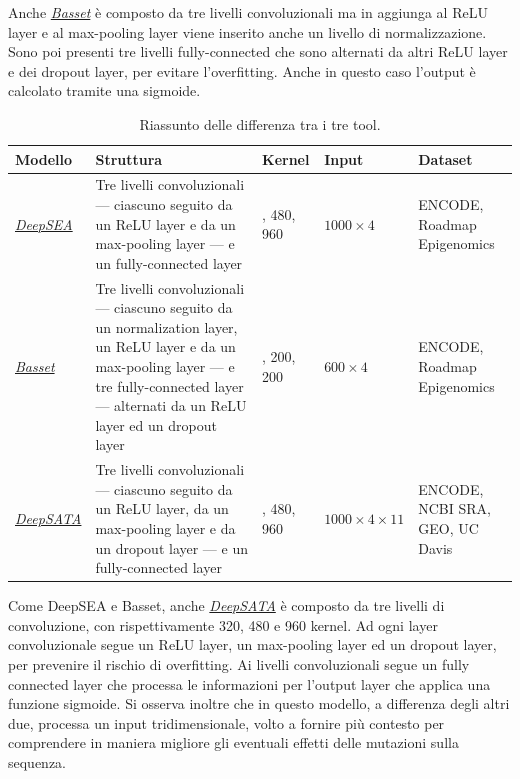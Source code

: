 Anche \hyperref[sec:Basset]{\textsl{Basset}} è composto da tre livelli convoluzionali ma in aggiunga al \acs{ReLU} layer e al max-pooling layer viene inserito anche un livello di normalizzazione. Sono poi presenti tre livelli fully-connected che sono alternati da altri \acs{ReLU} layer e dei dropout layer, per evitare l'overfitting. Anche in questo caso l'output è calcolato tramite una sigmoide.
% 
\begin{table}[!t]
    \centering
    \caption{Riassunto delle differenza tra i tre tool.}\label{tab:summary}
    \renewcommand{\arraystretch}{2}
    \begin{tabular}{|>{\centering\arraybackslash}m{2cm}|>{\centering\arraybackslash}m{4.5cm}|>{\centering\arraybackslash}m{1.5cm}|>{\centering\arraybackslash}m{1.5cm}|>{\centering\arraybackslash}m{3cm}|} %
        \hline %
        \textbf{Modello} & \textbf{Struttura} & \textbf{Kernel} & \textbf{Input} & \textbf{Dataset} \\ 
        \hline\hline %
        \hyperref[sec:DeepSEA]{\textsl{DeepSEA}} & Tre livelli convoluzionali — ciascuno seguito da un \acs{ReLU} layer e da un max-pooling layer — e un fully-connected layer  &  320, 480, 960 & $1000\times 4$ & \acs{ENCODE}, Roadmap Epigenomics\\ 
        \hyperref[sec:Basset]{\textsl{Basset}} & Tre livelli convoluzionali — ciascuno seguito da un normalization layer, un \acs{ReLU} layer e da un max-pooling layer — e tre fully-connected layer — alternati da un \acs{ReLU} layer ed un dropout layer &  300, 200, 200 & $600 \times 4$ & \acs{ENCODE}, Roadmap Epigenomics\\ 
        \hyperref[sec:DeepSATA]{\textsl{DeepSATA}} & Tre livelli convoluzionali — ciascuno seguito da un \acs{ReLU} layer, da un max-pooling layer e da un dropout layer — e un fully-connected layer & 320, 480, 960 & $1000\times 4\times 11$ & \acs{ENCODE}, \acs{NCBI} \acs{SRA}, \acs{GEO}, UC Davis\\ 
        \hline
    \end{tabular}
    \renewcommand{\arraystretch}{1}
\end{table}

Come DeepSEA e Basset, anche \hyperref[sec:DeepSATA]{\textsl{DeepSATA}} è composto da tre livelli di convoluzione, con rispettivamente 320, 480 e 960 kernel. Ad ogni layer convoluzionale segue un \acs{ReLU} layer, un max-pooling layer ed un dropout layer, per prevenire il rischio di overfitting. Ai livelli convoluzionali segue un fully connected layer che processa le informazioni per l'output layer che applica una funzione sigmoide. Si osserva inoltre che in questo modello, a differenza degli altri due, processa un input tridimensionale, volto a fornire più contesto per comprendere in maniera migliore gli eventuali effetti delle mutazioni sulla sequenza.

